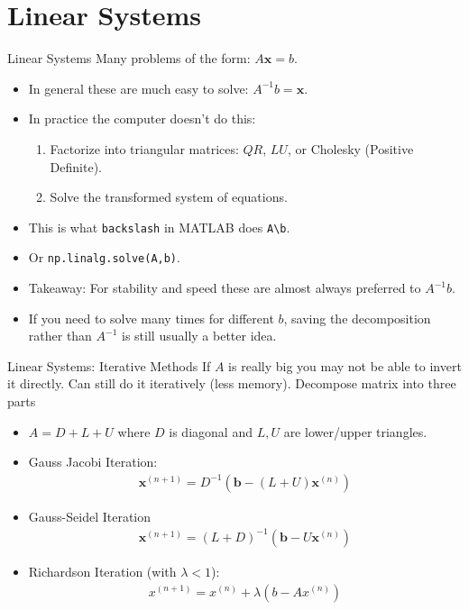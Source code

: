 \section{Linear Systems}
\begin{frame}{Linear Systems}
Many problems of the form: $A \symbf{x} = b$.
\begin{itemize}
\item In general these are much easy to solve: $A^{-1} b = \symbf{x}$.
\item In practice the computer doesn't do this:
\begin{enumerate}
\item Factorize into triangular matrices: $QR$, $LU$, or Cholesky (Positive Definite).
\item Solve the transformed system of equations.
\end{enumerate}
\item This is what \texttt{backslash} in MATLAB does \texttt{A\textbackslash  b}.
\item Or \texttt{np.linalg.solve(A,b)}.
\item Takeaway: For stability and speed these are almost always preferred to $A^{-1}b$.
\item If you need to solve many times for different $b$, saving the decomposition rather than $A^{-1}$ is still usually a better idea.
\end{itemize}
\end{frame}

\begin{frame}{Linear Systems: Iterative Methods}
If $A$ is really big you may not be able to invert it directly. Can still do it iteratively (less memory). Decompose matrix into three parts
\begin{itemize}
\item $A = D + L + U$ where $D$ is diagonal and $L,U$ are lower/upper triangles.
\item Gauss Jacobi Iteration:
\begin{align*}
\symbf{x}^{(n+1)}=D^{-1}\left(\symbf{b}-(L+U) \symbf{x}^{(n)}\right)
\end{align*}
\item Gauss-Seidel Iteration
\begin{align*}
\symbf{x}^{(n+1)}=(L+D)^{-1}\left(\symbf{b}-U \symbf{x}^{(n)}\right)
\end{align*}
\item Richardson Iteration (with $\lambda < 1$):
\begin{align*}
x^{(n+1)}=x^{(n)}+\lambda \left(b-A x^{(n)}\right)
\end{align*}
\end{itemize}
\end{frame}





